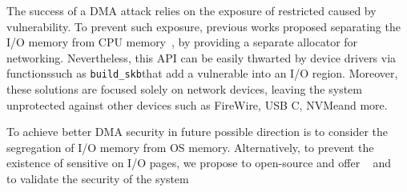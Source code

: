 The success of a DMA attack relies on the exposure of restricted \DIFdelbegin {}\DIFdelend \DIFaddbegin {}\DIFaddend caused by \subpage{} vulnerability. 
To prevent such exposure, previous works \DIFdelbegin {}\DIFdelend proposed separating the I/O memory from CPU memory~\cite{MSMT18}, by providing a separate allocator for networking. 
Nevertheless, this API can be easily thwarted by device drivers via functions\DIFaddbegin \DIFadd{, }\DIFaddend such as \texttt{build\_skb}\DIFaddbegin \DIFadd{, }\DIFaddend that add a vulnerable \shinfo into an I/O region. 
Moreover, these solutions are focused solely on network devices, leaving the system unprotected against other \DIFdelbegin {}\DIFdelend \DIFaddbegin {}\DIFaddend devices such as FireWire, USB C, NVMe\DIFaddbegin \DIFadd{, }\DIFaddend and more.


To achieve better DMA security in future \DIFdelbegin {}\DIFdelend \DIFaddbegin {}\DIFaddend possible direction is to consider the segregation of I/O memory from OS memory. 
Alternatively, to prevent the existence of sensitive \DIFdelbegin {}\DIFdelend \DIFaddbegin {}\DIFaddend on I/O pages, we propose to open-source and offer \DIFdelbegin {}\DIFdelend \tool{}~\cite{SPADE} and \dkasan{}~\cite{DKASAN} to \DIFdelbegin {}\DIFdelend validate the security of the system \DIFdelbegin {}\DIFdelend \DIFaddbegin {}\DIFaddend 



 



